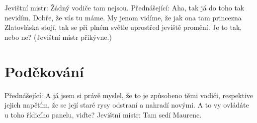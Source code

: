 \documentclass{cygclanek}
\begin{document}
Jevištní mistr: Žádný vodiče tam nejsou. Přednášející: Aha, tak já do toho tak nevidím. Dobře, že vás tu máme. My jenom vidíme, že jak ona tam princezna Zlatovláska stojí, tak se při plném světle uprostřed jeviště promění. Je to tak, nebo ne? (Jevištní mistr přikývne.)
\section*{Poděkování}
Přednášející: A já jsem si právě myslel, že to je způsobeno těmi vodiči, respektive jejich napětím, že se její staré rysy odstraní a nahradí novými. A to vy ovládáte u toho řídicího panelu, viďte? Jevištní mistr: Tam sedí Maurenc.



\printbibliography[title={Literatura}]
\end{document}
